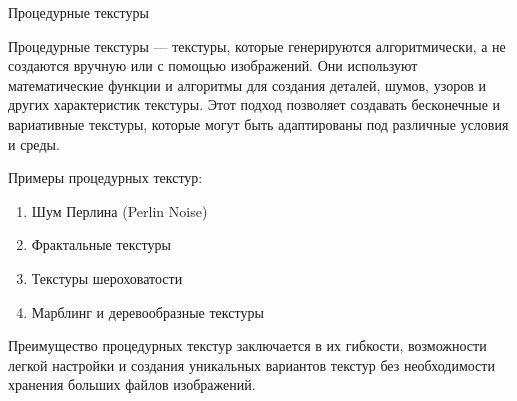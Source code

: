 \documentclass{beamer}
\begin{document}
	\begin{frame}{Процедурные текстуры}

		Процедурные текстуры --- текстуры, которые генерируются алгоритмически, а не создаются вручную или с помощью изображений. 
		Они используют математические функции и алгоритмы для создания деталей, шумов, узоров и других характеристик текстуры. Этот подход позволяет создавать бесконечные и вариативные текстуры, которые могут быть адаптированы под различные условия и среды.

Примеры процедурных текстур:
\begin{enumerate}
	\item 
	Шум Перлина (Perlin Noise)%
	\item
	Фрактальные текстуры%
	\item
	Текстуры шероховатости%
	\item
	Марблинг и деревообразные текстуры%
\end{enumerate}

	Преимущество процедурных текстур заключается в их гибкости, возможности легкой настройки и создания уникальных вариантов текстур без необходимости хранения больших файлов изображений.

	\end{frame}
\end{document}
